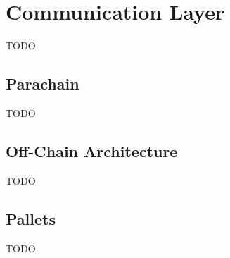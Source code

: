 \section{Communication Layer}
TODO

\subsection{Parachain}
TODO

\subsection{Off-Chain Architecture}
TODO

\subsection{Pallets}
TODO
